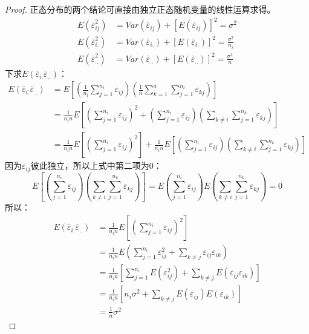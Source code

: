 \begin{proof}
	正态分布的两个结论可直接由独立正态随机变量的线性运算求得。
	\begin{align*}
		E(\bar{\varepsilon}_{ij}^2)&=Var(\bar{\varepsilon}_{ij})+[E(\bar{\varepsilon}_{ij})]^2=\sigma^2 \\
		E(\bar{\varepsilon}_{i.}^2)&=Var(\bar{\varepsilon}_{i.})+[E(\bar{\varepsilon}_{i.})]^2=\frac{\sigma^2}{n_i} \\
		E(\bar{\varepsilon}_{..}^2)&=Var(\bar{\varepsilon}_{..})+[E(\bar{\varepsilon}_{..})]^2=\frac{\sigma^2}{n}
	\end{align*}
	下求$E(\bar{\varepsilon}_{i.}\bar{\varepsilon}_{..})$：
	\begin{align*}
		E(\bar{\varepsilon}_{i.}\bar{\varepsilon}_{..})
		&=E\left[\left(\frac{1}{n_i}\sum_{j=1}^{n_i}\varepsilon_{ij}\right)\left(\frac{1}{n}\sum_{k=1}^a\sum_{j=1}^{n_i}\varepsilon_{kj}\right)\right] \\
		&=\frac{1}{n_in}E\left[\left(\sum_{j=1}^{n_i}\varepsilon_{ij}\right)^2+\left(\sum_{j=1}^{n_i}\varepsilon_{ij}\right)\left(\sum_{k\ne i}\sum_{j=1}^{n_k}\varepsilon_{kj}\right)\right] \\
		&=\frac{1}{n_in}E\left[\left(\sum_{j=1}^{n_i}\varepsilon_{ij}\right)^2\right]+\frac{1}{n_in}E\left[\left(\sum_{j=1}^{n_i}\varepsilon_{ij}\right)\left(\sum_{k\ne i}\sum_{j=1}^{n_k}\varepsilon_{kj}\right)\right]
	\end{align*}
	因为$\varepsilon_{ij}$彼此独立，所以上式中第二项为$0$：
	\begin{equation*}
		E\left[\left(\sum_{j=1}^{n_i}\varepsilon_{ij}\right)\left(\sum_{k\ne i}\sum_{j=1}^{n_k}\varepsilon_{kj}\right)\right]=E\left(\sum_{j=1}^{n_i}\varepsilon_{ij}\right)E\left(\sum_{k\ne i}\sum_{j=1}^{n_k}\varepsilon_{kj}\right)=0
	\end{equation*}
	所以：
	\begin{align*}
		E(\bar{\varepsilon}_{i.}\bar{\varepsilon}_{..})
		&=\frac{1}{n_in}E\left[\left(\sum_{j=1}^{n_i}\varepsilon_{ij}\right)^2\right] \\
		&=\frac{1}{n_in}E\left(\sum_{j=1}^{n_i}\varepsilon_{ij}^2+\sum_{k\ne j}\varepsilon_{ij}\varepsilon_{ik}\right) \\
		&=\frac{1}{n_in}\left[\sum_{j=1}^{n_i}E(\varepsilon_{ij}^2)+\sum_{k\ne j}E(\varepsilon_{ij}\varepsilon_{ik})\right] \\
		&=\frac{1}{n_in}\left[n_i\sigma^2+\sum_{k\ne j}E(\varepsilon_{ij})E(\varepsilon_{ik})\right] \\
		&=\frac{1}{n}\sigma^2
	\end{align*}

\end{proof}
